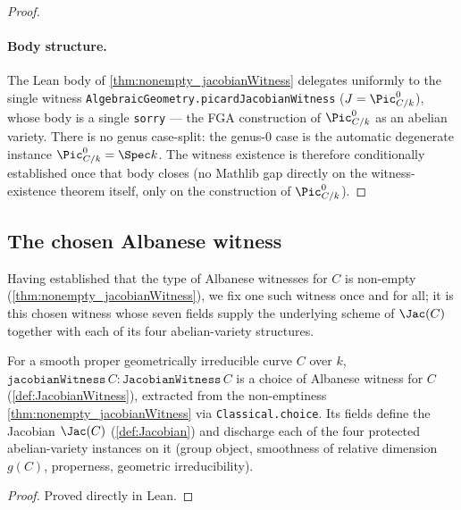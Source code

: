 \begin{proof}
  \paragraph{Body structure.} The Lean body of \cref{thm:nonempty_jacobianWitness} delegates uniformly to the single witness \texttt{AlgebraicGeometry.picardJacobianWitness} (\(J = \Pic^0_{C/k}\)), whose body is a single \texttt{sorry} --- the FGA construction of \(\Pic^0_{C/k}\) as an abelian variety. There is no genus case-split: the genus-\(0\) case is the automatic degenerate instance \(\Pic^0_{C/k} = \Spec k\). The witness existence is therefore conditionally established once that body closes (no Mathlib gap directly on the witness-existence theorem itself, only on the construction of \(\Pic^0_{C/k}\)).
\end{proof}
\subsection{The chosen Albanese witness}
Having established that the type of Albanese witnesses for \(C\) is non-empty (\cref{thm:nonempty_jacobianWitness}), we fix one such witness once and for all; it is this chosen witness whose seven fields supply the underlying scheme of \(\Jac(C)\) together with each of its four abelian-variety structures.
\begin{definition}

  \label{def:jacobianWitness}
  For a smooth proper geometrically irreducible curve \(C\) over \(k\), \(\mathtt{jacobianWitness}\,C \colon \mathtt{JacobianWitness}\,C\) is a choice of Albanese witness for \(C\) (\cref{def:JacobianWitness}), extracted from the non-emptiness \cref{thm:nonempty_jacobianWitness} via \texttt{Classical.choice}. Its fields define the Jacobian \(\Jac(C)\) (\cref{def:Jacobian}) and discharge each of the four protected abelian-variety instances on it (group object, smoothness of relative dimension \(g(C)\), properness, geometric irreducibility).
\end{definition}
\begin{proof}
  Proved directly in Lean.
\end{proof}
